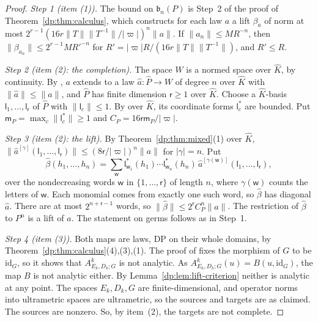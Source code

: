 \documentclass[11pt]{amsart}
\theoremstyle{definition}
\theoremstyle{remark}
\numberwithin{equation}{section}
\newcommand{\id}{\mathrm{id}}
\newcommand{\abs}[1]{\lvert #1\rvert}
\newcommand{\norm}[1]{\lVert #1\rVert}
\newcommand{\Kh}{\widehat K}
\theoremstyle{plain}
\theoremstyle{definition}
\theoremstyle{plain}
\begin{document}
\begin{proof}
\emph{Step 1 (item (1)).} The bound on $\mathfrak b_n(P)$ is Step~2 of the proof of Theorem~\ref{dp:thm:calculus}, which constructs for each law $a$ a lift $\beta_a$ of norm at most $2^{r-1}(16r\norm T\norm{T^{-1}}/\abs\varpi)^n\norm a$. If $\norm{a_n}\le MR^{-n}$, then $\norm{\beta_{a_n}}\le2^{r-1}MR'^{-n}$ for $R'=\abs\varpi R/(16r\norm T\norm{T^{-1}})$, and $R'\le R$.

\emph{Step 2 (item (2): the completion).} The space $W$ is a normed space over $\Kh$, by continuity. By \cite[Lemma~Q.13(1),(2)]{I}, $a$ extends to a law $\hat a\colon\widehat P\to W$ of degree $n$ over $\Kh$ with $\norm{\hat a}\le\norm a$, and $\widehat P$ has finite dimension $\mathsf r\ge1$ over $\Kh$. Choose a $\Kh$\nobreakdash-basis $\mathsf l_1,\dots,\mathsf l_{\mathsf r}$ of $\widehat P$ with $\norm{\mathsf l_c}\le1$. By \cite[Lemma~A.3]{I} over $\Kh$, its coordinate forms $\mathsf l_c^*$ are bounded. Put $\mathsf m_P=\max_c\norm{\mathsf l_c^*}\ge1$ and $C_P=16\mathsf r\mathsf m_P/\abs\varpi$.

\emph{Step 3 (item (2): the lift).} By Theorem~\ref{dp:thm:mixed}(1) over $\Kh$, $\norm{\hat a^{[\gamma]}(\mathsf l_1,\dots,\mathsf l_{\mathsf r})}\le(8\mathsf r/\abs\varpi)^n\norm a$ for $\abs\gamma=n$. Put
\[
 \hat\beta(h_1,\dots,h_n)=\sum_{\mathsf w}\mathsf l^*_{\mathsf w_1}(h_1)\cdots\mathsf l^*_{\mathsf w_n}(h_n)\,\hat a^{[\gamma(\mathsf w)]}(\mathsf l_1,\dots,\mathsf l_{\mathsf r}),
\]
over the nondecreasing words $\mathsf w$ in $\{1,\dots,\mathsf r\}$ of length $n$, where $\gamma(\mathsf w)$ counts the letters of $\mathsf w$. Each monomial comes from exactly one such word, so $\hat\beta$ has diagonal $\hat a$. There are at most $2^{n+\mathsf r-1}$ words, so $\norm{\hat\beta}\le2^{\mathsf r}C_P^n\norm a$. The restriction of $\hat\beta$ to $P^n$ is a lift of $a$. The statement on germs follows as in Step~1.

\emph{Step 4 (item (3)).} Both maps are laws, DP on their whole domains, by Theorem~\ref{dp:thm:calculus}(4),(3),(1). The proof of \cite[Theorem~H.4]{I} fixes the morphism of $G$ to be $\id_G$, so it shows that $A^k_{E_k,D_k;G}$ is not analytic. As $A^k_{E_k,D_k;G}(u)=B(u,\id_G)$, the map $B$ is not analytic either. By Lemma~\ref{dp:lem:lift-criterion} neither is analytic at any point. The spaces $E_k,D_k,G$ are finite-dimensional, and operator norms into ultrametric spaces are ultrametric, so the sources and targets are as claimed. The sources are nonzero. So, by item~(2), the targets are not complete.
\end{proof}
\end{document}
